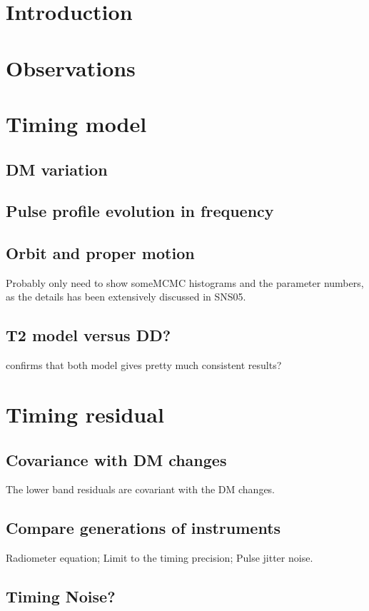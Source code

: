 
\section{Introduction}

\section{Observations}

\section{Timing model}
\subsection{DM variation}

\subsection{Pulse profile evolution in frequency}
\subsection{Orbit and proper motion}
Probably only need to show someMCMC histograms and the parameter numbers, as the details
has been extensively discussed in SNS05.
\subsection{T2 model versus DD?}
confirms that both model gives pretty much consistent results?

\section{Timing residual}

\subsection{Covariance with DM changes}
The lower band residuals are covariant with the DM changes.
\subsection{Compare generations of instruments}
Radiometer equation; Limit to the timing precision; Pulse jitter noise.
\subsection{Timing Noise?}


